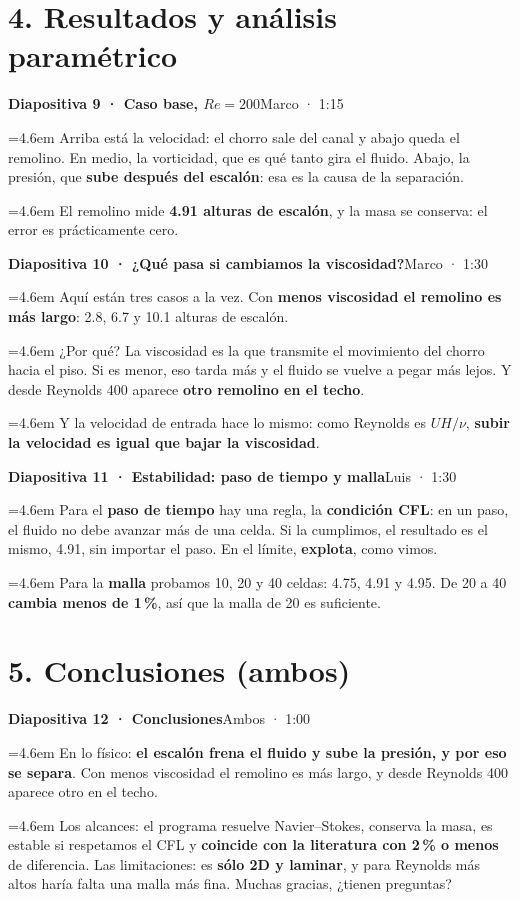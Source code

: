 \documentclass[11pt,letterpaper]{article}
\newcommand{\habla}[3]{\par\noindent\hangindent=4.6em\hangafter=1%
  \makebox[4.6em][l]{\textbf{\textcolor{#1}{#2:}}}#3\par\medskip}
\newcommand{\luis}[1]{\habla{marino}{Luis}{#1}}
\newcommand{\marco}[1]{\habla{verde}{Marco}{#1}}
\newcommand{\accion}[1]{\par\noindent{\small\itshape\color{gray}[#1]}\par\medskip}
\newcommand{\diapo}[3]{\vspace{0.5em}\par\noindent\colorbox{fondo}{\parbox{\dimexpr\linewidth-2\fboxsep}{%
  \textbf{\color{marino}Diapositiva #1 · #2}\hfill{\small #3}}}\par\medskip}
\begin{document}
\section*{4. Resultados y análisis paramétrico}
\diapo{9}{Caso base, $\mathit{Re}=200$}{Marco · 1:15}
\marco{Arriba está la velocidad: el chorro sale del canal y abajo queda el remolino. En medio, la vorticidad, que es qué
tanto gira el fluido. Abajo, la presión, que \textbf{sube después del escalón}: esa es la causa de la separación.}
\marco{El remolino mide \textbf{4.91 alturas de escalón}, y la masa se conserva: el error es prácticamente cero.}

\diapo{10}{¿Qué pasa si cambiamos la viscosidad?}{Marco · 1:30}
\accion{Reproducir el video.}
\marco{Aquí están tres casos a la vez. Con \textbf{menos viscosidad el remolino es más largo}: 2.8, 6.7 y 10.1 alturas de
escalón.}
\marco{¿Por qué? La viscosidad es la que transmite el movimiento del chorro hacia el piso. Si es menor, eso tarda más y el
fluido se vuelve a pegar más lejos. Y desde Reynolds 400 aparece \textbf{otro remolino en el techo}.}
\luis{Y la velocidad de entrada hace lo mismo: como Reynolds es $UH/\nu$, \textbf{subir la velocidad es igual que bajar la
viscosidad}.}

\diapo{11}{Estabilidad: paso de tiempo y malla}{Luis · 1:30}
\luis{Para el \textbf{paso de tiempo} hay una regla, la \textbf{condición CFL}: en un paso, el fluido no debe avanzar más de
una celda. Si la cumplimos, el resultado es el mismo, 4.91, sin importar el paso. En el límite, \textbf{explota}, como
vimos.}
\luis{Para la \textbf{malla} probamos 10, 20 y 40 celdas: 4.75, 4.91 y 4.95. De 20 a 40 \textbf{cambia menos de 1\,\%},
así que la malla de 20 es suficiente.}

\section*{5. Conclusiones (ambos)}
\diapo{12}{Conclusiones}{Ambos · 1:00}
\luis{En lo físico: \textbf{el escalón frena el fluido y sube la presión, y por eso se separa}. Con menos viscosidad el
remolino es más largo, y desde Reynolds 400 aparece otro en el techo.}
\marco{Los alcances: el programa resuelve Navier–Stokes, conserva la masa, es estable si respetamos el CFL y
\textbf{coincide con la literatura con 2\,\% o menos} de diferencia. Las limitaciones: es \textbf{sólo 2D y laminar}, y
para Reynolds más altos haría falta una malla más fina. Muchas gracias, ¿tienen preguntas?}
\end{document}
